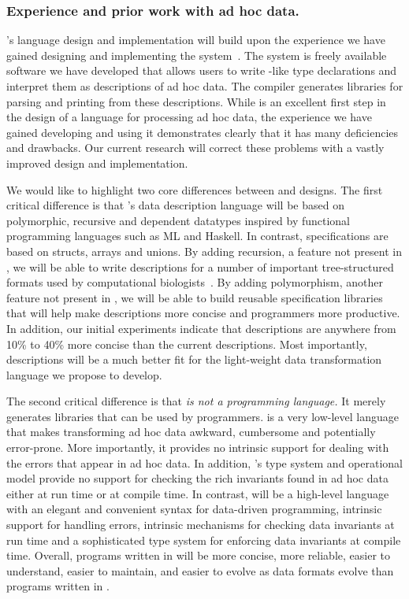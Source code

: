 \documentclass[11pt]{article}
\begin{document}
\subsubsection{Experience and prior work with ad hoc data.}
\datatype's language design and implementation will build upon the experience
we have gained designing and implementing the \pads{}
system~\cite{fisher+:pads,pads-website}.  The \pads{} system 
is freely available software we have developed that allows
users to write \C-like type declarations and interpret them as
descriptions of ad hoc data.  The \pads{} compiler generates libraries
for parsing and printing from these descriptions.  
While \pads{} is an excellent first step in the design of
a language for processing ad hoc data, the experience we have
gained developing and using it demonstrates clearly that 
it has many deficiencies and drawbacks.  Our current research 
will correct these problems with a vastly improved
design and implementation.

We would like to highlight two core differences between \pads{} and 
\datatype{} designs.  The first critical difference is that 
\datatype's data description language will be based on
polymorphic, recursive and dependent datatypes inspired by
functional programming languages such as ML and Haskell.  In contrast,
\pads{} specifications are based on \C{} structs, arrays
and unions.  By adding recursion, a feature not present in
\pads, we will be able to write descriptions for a
number of important tree-structured formats used by computational 
biologists~\cite{geneontology,newick}.  
By adding polymorphism, another feature not present in \pads,
we will be able to build reusable specification
libraries that will help make descriptions more concise and 
programmers more productive.  In addition, our initial
experiments indicate that \datatype{} descriptions are anywhere from
10\% to 40\% more concise than the current \pads{} descriptions.  Most
importantly, \datatype{} descriptions will be a much better fit for the
light-weight data transformation language we propose to develop.  

The second critical difference is that {\em \pads{} is not a programming
language.}  It merely generates libraries that can be used by \C{}
programmers.  \C{} is a very low-level language that makes
transforming ad hoc data awkward, cumbersome and potentially
error-prone.  More importantly, it provides no intrinsic support for
dealing with the errors that appear in ad hoc data.  In addition, \C's
type system and operational model provide no support for checking the
rich invariants found in ad hoc data either at run time or at compile
time.  In contrast, \datatype{} will be a high-level language with an
elegant and convenient syntax for data-driven programming, intrinsic
support for handling errors, intrinsic mechanisms for checking data
invariants at run time and a sophisticated type system for enforcing
data invariants at compile time.  Overall,
programs written in \datatype{} will be more concise, more reliable,
easier to understand,
easier to maintain, and easier to evolve as data formats evolve
than programs written in \C.
\end{document}
